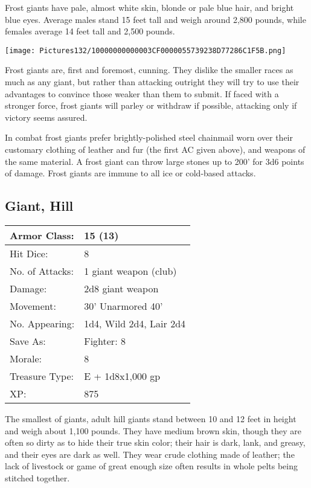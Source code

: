 \documentclass[a4paper,twoside,openany,10pt]{book}
\begin{document}
\begin{multicols}{2}
Frost giants have pale, almost white skin, blonde or pale blue hair, and bright blue eyes. Average males stand 15 feet tall and weigh around 2,800 pounds, while females average 14 feet tall and 2,500 pounds.


\begin{center}
	\texttt{[image: Pictures132/10000000000003CF0000055739238D77286C1F5B.png]}
\end{center}

Frost giants are, first and foremost, cunning. They dislike the smaller races as much as any giant, but rather than attacking outright they will try to use their advantages to convince those weaker than them to submit. If faced with a stronger force, frost giants will parley or withdraw if possible, attacking only if victory seems assured.

In combat frost giants prefer brightly-polished steel chainmail worn over their customary clothing of leather and fur (the first AC given above), and weapons of the same material. A frost giant can throw large stones up to 200' for 3d6 points of damage. Frost giants are immune to all ice or cold-based attacks.


\subsection*{Giant, Hill}\label{giant-hill}

\begin{tabularx}{0.48\textwidth}{@{}lX@{}}
Armor Class: & 15 (13) \\\hline
Hit Dice: & 8 \\\hline
No. of Attacks: & 1 giant weapon (club) \\\hline
Damage: & 2d8 giant weapon \\\hline
Movement: & 30' Unarmored 40' \\\hline
No. Appearing: & 1d4, Wild 2d4, Lair 2d4 \\\hline
Save As: & Fighter: 8 \\\hline
Morale: & 8 \\\hline
Treasure Type: & E + 1d8x1,000 gp \\\hline
XP: & 875 \\\hline
\end{tabularx}\medskip

The
smallest of giants, adult hill giants stand between 10 and 12 feet in height and weigh about 1,100 pounds. They have medium brown skin, though they are often so dirty as to hide their true skin color; their hair is dark, lank, and greasy, and their eyes are dark as well. They wear crude clothing made of leather; the lack of livestock or game of great enough size often results in whole pelts being stitched together.


\end{multicols}
\end{document}
